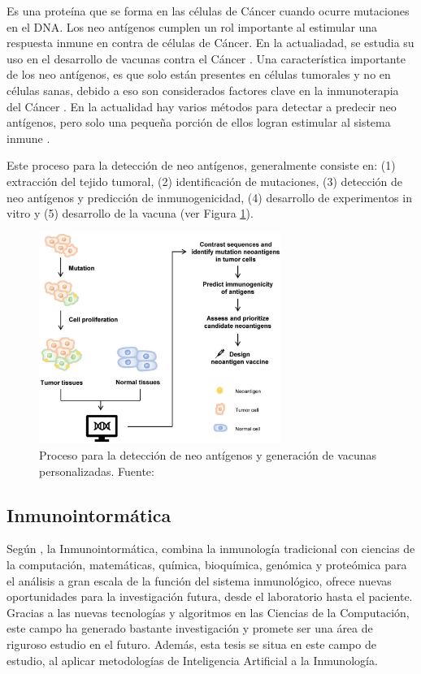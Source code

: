 Es una proteína que se forma en las células de Cáncer cuando ocurre mutaciones en el DNA. Los neo antígenos cumplen un rol importante al estimular una respuesta inmune en contra de células de Cáncer. En la actualiadad, se estudia su uso en el desarrollo de vacunas contra el Cáncer \cite{NCIdictionary2022}. Una característica importante de los neo antígenos, es que solo están presentes en células tumorales y no en células sanas, debido a eso son considerados factores clave en la inmunoterapia del Cáncer \cite{borden2022cancer}. En la actualidad hay varios métodos para detectar a predecir neo antígenos, pero solo una pequeña porción de ellos logran estimular al sistema inmune \cite{chen2021challenges, hao2021improvement}.

 Este proceso para la detección de neo antígenos, generalmente consiste en: (1) extracción del tejido tumoral, (2) identificación de mutaciones, (3) detección de neo antígenos y predicción de inmunogenicidad, (4) desarrollo de experimentos in vitro y (5) desarrollo de la vacuna \citep{de2020neoantigen, peng2019neoantigen} (ver Figura \ref{fig:process}). 

\begin{figure}[H]
	\centering
	\includegraphics[width=0.7\textwidth]{../img/neoantigen/process}	
	\caption{Proceso para la detección de neo antígenos y generación de vacunas personalizadas. Fuente: \citep{de2020neoantigen} }
	\label{fig:process}
\end{figure}


\subsection{Inmunointormática}

Según \cite{tong2009immunoinformatics}, la Inmunointormática,  combina la inmunología tradicional con ciencias de la computación, matemáticas, química, bioquímica, genómica y proteómica para el análisis a gran escala de la función del sistema inmunológico, ofrece nuevas oportunidades para la investigación futura, desde el laboratorio hasta el paciente. Gracias a las nuevas tecnologías y algoritmos en las Ciencias de la Computación, este campo ha generado bastante investigación y promete ser una área de riguroso estudio en el futuro. Además, esta tesis se situa en este campo de estudio, al aplicar metodologías de Inteligencia Artificial a la Inmunología.

